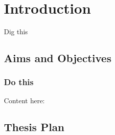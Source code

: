 
\chapter{Introduction}
Dig this

\section{Aims and Objectives}\label{s:aims}


\subsection{Do this}

Content here:
\section{Thesis Plan}\label{s:thesisplan}

